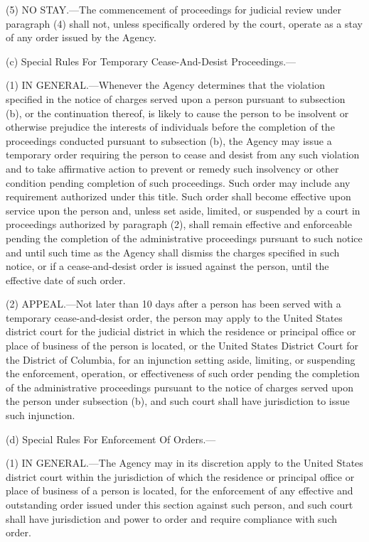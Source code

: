 (5) NO STAY.—The commencement of proceedings for judicial review under paragraph (4) shall not, unless specifically ordered by the court, operate as a stay of any order issued by the Agency.

(c) Special Rules For Temporary Cease-And-Desist Proceedings.—

(1) IN GENERAL.—Whenever the Agency determines that the violation specified in the notice of charges served upon a person pursuant to subsection (b), or the continuation thereof, is likely to cause the person to be insolvent or otherwise prejudice the interests of individuals before the completion of the proceedings conducted pursuant to subsection (b), the Agency may issue a temporary order requiring the person to cease and desist from any such violation and to take affirmative action to prevent or remedy such insolvency or other condition pending completion of such proceedings. Such order may include any requirement authorized under this title. Such order shall become effective upon service upon the person and, unless set aside, limited, or suspended by a court in proceedings authorized by paragraph (2), shall remain effective and enforceable pending the completion of the administrative proceedings pursuant to such notice and until such time as the Agency shall dismiss the charges specified in such notice, or if a cease-and-desist order is issued against the person, until the effective date of such order.

(2) APPEAL.—Not later than 10 days after a person has been served with a temporary cease-and-desist order, the person may apply to the United States district court for the judicial district in which the residence or principal office or place of business of the person is located, or the United States District Court for the District of Columbia, for an injunction setting aside, limiting, or suspending the enforcement, operation, or effectiveness of such order pending the completion of the administrative proceedings pursuant to the notice of charges served upon the person under subsection (b), and such court shall have jurisdiction to issue such injunction.

(d) Special Rules For Enforcement Of Orders.—

(1) IN GENERAL.—The Agency may in its discretion apply to the United States district court within the jurisdiction of which the residence or principal office or place of business of a person is located, for the enforcement of any effective and outstanding order issued under this section against such person, and such court shall have jurisdiction and power to order and require compliance with such order.

